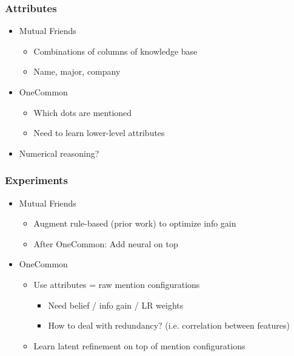 \documentclass{beamer}
\begin{document}
\begin{frame}
\frametitle{Attributes}
\begin{itemize}
\item Mutual Friends
    \begin{itemize}
    \item Combinations of columns of knowledge base
    \item Name, major, company
    \end{itemize}
\item OneCommon
    \begin{itemize}
    \item Which dots are mentioned
    \item Need to learn lower-level attributes
    \end{itemize}
\item Numerical reasoning?
\end{itemize}
\end{frame}

\begin{frame}
\frametitle{Experiments}
\begin{itemize}
\item Mutual Friends
    \begin{itemize}
    \item Augment rule-based (prior work) to optimize info gain
    \item After OneCommon: Add neural on top
    \end{itemize}
\item OneCommon
    \begin{itemize}
    \item Use attributes = raw mention configurations
        \begin{itemize}
        \item Need belief / info gain / LR weights
        \item How to deal with redundancy? (i.e. correlation between features)
        \end{itemize}
    \item Learn latent refinement on top of mention configurations
    \end{itemize}
\end{itemize}
\end{frame}
\end{document}
